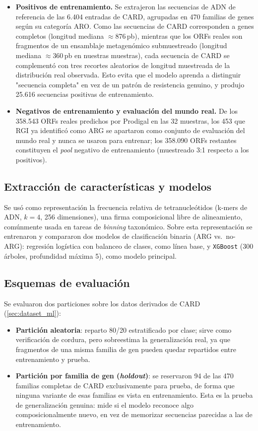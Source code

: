 \documentclass[journal]{vgtc}                     %
\begin{document}
\begin{itemize}
  \item \textbf{Positivos de entrenamiento.} Se extrajeron las secuencias de ADN de referencia de las 6.404 entradas de CARD, agrupadas en 470 familias de genes según su categoría ARO. Como las secuencias de CARD corresponden a genes completos (longitud mediana $\approx$876\,pb), mientras que los ORFs reales son fragmentos de un ensamblaje metagenómico submuestreado (longitud mediana $\approx$360\,pb en nuestras muestras), cada secuencia de CARD se complementó con tres recortes aleatorios de longitud muestreada de la distribución real observada. Esto evita que el modelo aprenda a distinguir "secuencia completa" en vez de un patrón de resistencia genuino, y produjo 25.616 secuencias positivas de entrenamiento.
  \item \textbf{Negativos de entrenamiento y evaluación del mundo real.} De los 358.543 ORFs reales predichos por Prodigal en las 32 muestras, los 453 que RGI ya identificó como ARG se apartaron como conjunto de evaluación del mundo real y nunca se usaron para entrenar; los 358.090 ORFs restantes constituyen el \emph{pool} negativo de entrenamiento (muestreado 3:1 respecto a los positivos).
\end{itemize}

\subsection{Extracción de características y modelos}

Se usó como representación la frecuencia relativa de tetranucleótidos (k-mers de ADN, $k=4$, 256 dimensiones), una firma composicional libre de alineamiento, comúnmente usada en tareas de \emph{binning} taxonómico. Sobre esta representación se entrenaron y compararon dos modelos de clasificación binaria (ARG vs.\ no-ARG): regresión logística con balanceo de clases, como línea base, y \texttt{XGBoost} (300 árboles, profundidad máxima 5), como modelo principal.

\subsection{Esquemas de evaluación}

Se evaluaron dos particiones sobre los datos derivados de CARD (\cref{sec:dataset_ml}):

\begin{itemize}
  \item \textbf{Partición aleatoria}: reparto 80/20 estratificado por clase; sirve como verificación de cordura, pero sobreestima la generalización real, ya que fragmentos de una misma familia de gen pueden quedar repartidos entre entrenamiento y prueba.
  \item \textbf{Partición por familia de gen (\emph{holdout})}: se reservaron 94 de las 470 familias completas de CARD exclusivamente para prueba, de forma que ninguna variante de esas familias es vista en entrenamiento. Esta es la prueba de generalización genuina: mide si el modelo reconoce algo composicionalmente nuevo, en vez de memorizar secuencias parecidas a las de entrenamiento.
\end{itemize}
\end{document}
